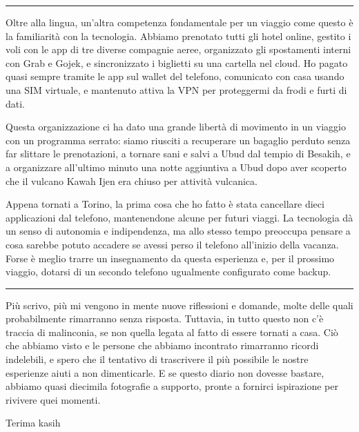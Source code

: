 \begin{center}
    \noindent\rule{0.6\textwidth}{0.4pt}
\end{center}

Oltre alla lingua, un'altra competenza fondamentale per un viaggio come questo è la familiarità con la tecnologia. Abbiamo prenotato tutti gli hotel online, gestito i voli con le app di tre diverse compagnie aeree, organizzato gli spostamenti interni con Grab e Gojek, e sincronizzato i biglietti su una cartella nel cloud. Ho pagato quasi sempre tramite le app sul wallet del telefono, comunicato con casa usando una SIM virtuale, e mantenuto attiva la VPN per proteggermi da frodi e furti di dati.

Questa organizzazione ci ha dato una grande libertà di movimento in un viaggio con un programma serrato: siamo riusciti a recuperare un bagaglio perduto senza far slittare le prenotazioni, a tornare sani e salvi a Ubud dal tempio di Besakih, e a organizzare all'ultimo minuto una notte aggiuntiva a Ubud dopo aver scoperto che il vulcano Kawah Ijen era chiuso per attività vulcanica.

Appena tornati a Torino, la prima cosa che ho fatto è stata cancellare dieci applicazioni dal telefono, mantenendone alcune per futuri viaggi. La tecnologia dà un senso di autonomia e indipendenza, ma allo stesso tempo preoccupa pensare a cosa sarebbe potuto accadere se avessi perso il telefono all'inizio della vacanza. Forse è meglio trarre un insegnamento da questa esperienza e, per il prossimo viaggio, dotarsi di un secondo telefono ugualmente configurato come backup.

\begin{center}
    \noindent\rule{0.6\textwidth}{0.4pt}
\end{center}

Più scrivo, più mi vengono in mente nuove riflessioni e domande, molte delle quali probabilmente rimarranno senza risposta. Tuttavia, in tutto questo non c'è traccia di malinconia, se non quella legata al fatto di essere tornati a casa. Ciò che abbiamo visto e le persone che abbiamo incontrato rimarranno ricordi indelebili, e spero che il tentativo di trascrivere il più possibile le nostre esperienze aiuti a non dimenticarle. E se questo diario non dovesse bastare, abbiamo quasi diecimila fotografie a supporto, pronte a fornirci ispirazione per rivivere quei momenti.
\newline 


Terima kasih


